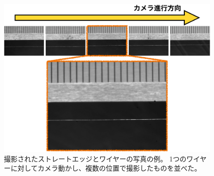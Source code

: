 \documentclass[../../main.tex]{subfiles}
\begin{document}
\begin{figure}[H]
    \centering
    \includegraphics[width=1.0\textwidth]{wiresag/wiresag_pictures.pdf}
    \caption{撮影されたストレートエッジとワイヤーの写真の例。
    1つのワイヤーに対してカメラ動かし、複数の位置で撮影したものを並べた。}
    \label{fig:wiresag_picture}    
\end{figure}
\end{document}
